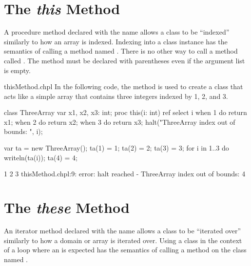 \section{The {\em this} Method}
\label{The_em_this_Method}

A procedure method declared with the name  allows a class to be
``indexed'' similarly to how an array is indexed.  Indexing into a
class instance has the semantics of calling a method
named .  There is no other way to call a method
called .  The  method must be declared with
parentheses even if the argument list is empty.

\begin{chapelexample}{thisMethod.chpl}
In the following code, the  method is used to create a
class that acts like a simple array that contains three integers
indexed by 1, 2, and 3.
\begin{chapel}
class ThreeArray {
  var x1, x2, x3: int;
  proc this(i: int) ref {
    select i {
      when 1 do return x1;
      when 2 do return x2;
      when 3 do return x3;
    }
    halt("ThreeArray index out of bounds: ", i);
  }
}
\end{chapel}
\begin{chapelpost}
var ta = new ThreeArray();
ta(1) = 1;
ta(2) = 2;
ta(3) = 3;
for i in 1..3 do
  writeln(ta(i));
ta(4) = 4;
\end{chapelpost}
\begin{chapeloutput}
1
2
3
thisMethod.chpl:9: error: halt reached - ThreeArray index out of bounds: 4
\end{chapeloutput}
\end{chapelexample}

\section{The {\em these} Method}
\label{The_these_Method}

An iterator method declared with the name  allows a class to be
``iterated over'' similarly to how a domain or array is iterated over.
Using a class in the context of a loop where
an  is expected has the semantics of calling
a method on the class named .

